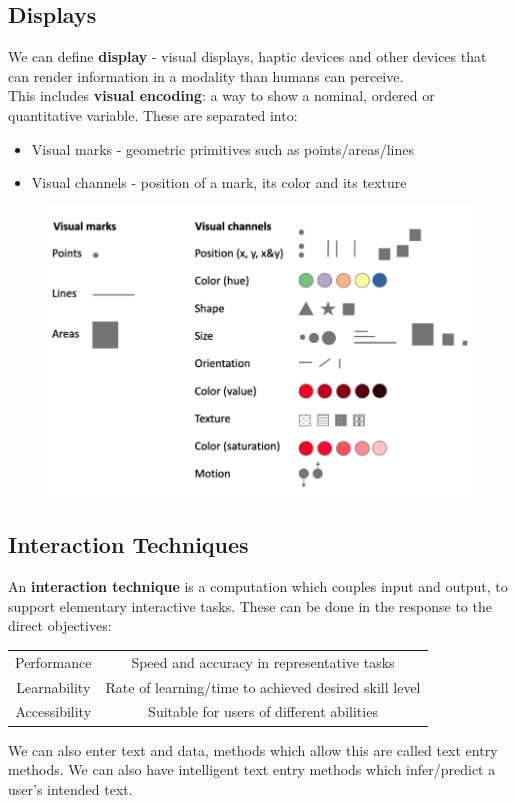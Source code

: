 \documentclass{article}
\begin{document}
\subsection{Displays}
We can define \textbf{display} - visual displays, haptic devices and other devices that can render information in a modality than humans can perceive. \\
This includes \textbf{visual encoding}: a way to show a nominal, ordered or quantitative variable. These are separated into:
\begin{itemize}
    \item Visual marks - geometric primitives such as points/areas/lines
    \item Visual channels - position of a mark, its color and its texture
\end{itemize}
\begin{figure}[H]
    \centering
    \includegraphics[width=0.5\linewidth]{Pictures/Screenshot 2023-03-04 at 18.46.20.png}
\end{figure}
\subsection{Interaction Techniques}
An \textbf{interaction technique} is a computation which couples input and output, to support elementary interactive tasks. These can be done in the response to the direct objectives:
\begin{center}
\begin{tabulary}{0.99\textwidth}{|C|C|}
    \hline
{} &  \\ 
                    \hline
Performance & Speed and accuracy in representative tasks \\ \hline
Learnability & Rate of learning/time to achieved desired skill level \\ \hline
Accessibility & Suitable for users of different abilities \\ \hline
    \end{tabulary}
\end{center}
We can also enter text and data, methods which allow this are called text entry methods. We can also have intelligent text entry methods which infer/predict a user's intended text.
\end{document}
